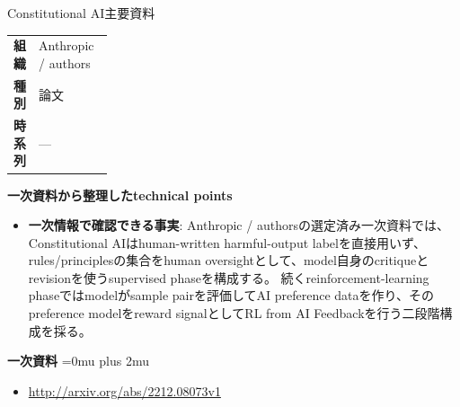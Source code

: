 \begin{technicalnote}{Constitutional AI}{主要資料}
\begingroup
\begin{tabularx}{\linewidth}{@{}>{\bfseries}p{0.22\linewidth}X@{}}
組織 & Anthropic / authors \\
種別 & 論文 \\
時系列 & — \\
\end{tabularx}
\smallskip
{\bfseries 一次資料から整理したtechnical points}
\begin{itemize}[leftmargin=1.5em,itemsep=0.35em]
\item \textbf{一次情報で確認できる事実}: Anthropic / authorsの選定済み一次資料では、Constitutional AIはhuman-written harmful-output labelを直接用いず、rules/principlesの集合をhuman oversightとして、model自身のcritiqueとrevisionを使うsupervised phaseを構成する。 続くreinforcement-learning phaseではmodelがsample pairを評価してAI preference dataを作り、そのpreference modelをreward signalとしてRL from AI Feedbackを行う二段階構成を採る。
\end{itemize}
\begin{minipage}{\linewidth}
\begin{samepage}
{\bfseries 一次資料}
\begingroup\sloppy
\Urlmuskip=0mu plus 2mu\relax
\begin{itemize}[leftmargin=1.5em,itemsep=0.25em]
\item {\scriptsize\url{http://arxiv.org/abs/2212.08073v1}}
\end{itemize}
\endgroup
\end{samepage}
\end{minipage}
\endgroup
\end{technicalnote}
\medskip

